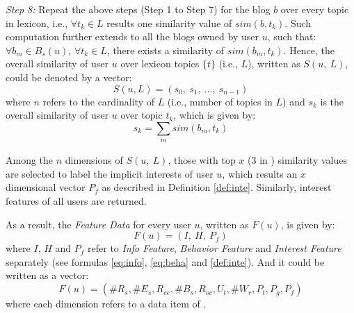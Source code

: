 \textit{Step 8:} Repeat the above steps (Step 1 to Step 7) for the blog $b$ over every topic in lexicon, i.e., $\forall t_k \in L$ results one similarity value of $sim(b, t_k)$.
Such computation further extends to all the blogs owned by user $u$, such that:
$\forall b_m \in B_s(u)$, $\forall t_k \in L$, there exists a similarity of $sim(b_m, t_k)$.
Hence, the overall similarity of user $u$ over lexicon topics $\{t\}$ (i.e., $L$), written as $S(u,\ L)$, could be denoted by a vector:
\begin{equation}
\label{eq:simul}
S(u, L) = (s_0,\ s_1,\ ...,\ s_{n-1})
\end{equation}
where $n$ refers to the cardinality of $L$ (i.e., number of topics in $L$) and $s_k$ is the overall similarity of user $u$ over topic $t_k$, which is given by:
\begin{equation}
\label{eq:simul-2}
s_k = \sum_{\substack{m}} sim(b_m, t_k)
\end{equation}

Among the $n$ dimensions of $S(u,\ L)$, those with top $x$ (3 in \sys{}) similarity values are selected to label the implicit interests of user $u$, which results an $x$ dimensional vector $P_f$ as described in Definition \ref{def:inte}.
Similarly, interest features of all users are returned.

As a result, the \textit{Feature Data} for every user $u$, written as $F(u)$, is given by:
\begin{equation}
\label{eq:fu}
	F(u) = (I,\ H,\ P_f)
\end{equation}
where $I$, $H$ and $P_f$ refer to \textit{Info Feature}, \textit{Behavior Feature} and \textit{Interest Feature} separately (see formulas \ref{eq:info}, \ref{eq:beha} and \ref{def:inte}).
And it could be written as a vector:
\begin{equation}
\label{eq:fu-flat}
	F(u) = (\#R_s, \#E_s, R_{ee}, \#B_s, R_{oc}, U_t, \#W_r, P_t, P_g, P_f)
\end{equation}
where each dimension refers to a data item of \sys{}.

